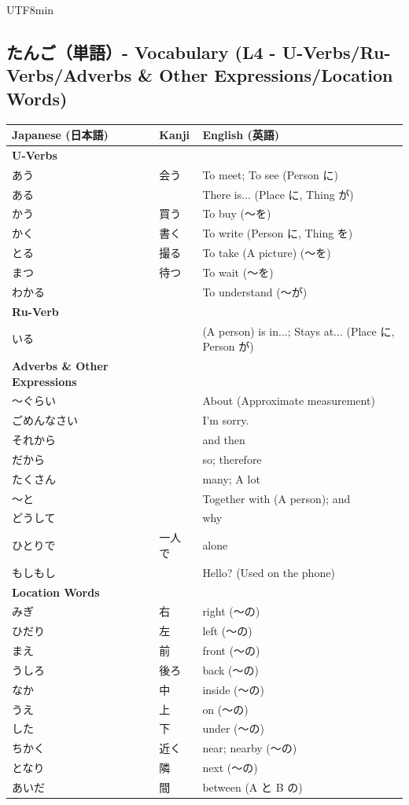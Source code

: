 \documentclass[11pt]{article}
\begin{document}
\begin{CJK}{UTF8}{min}
\subsection{たんご（単語）- Vocabulary (L4 - U-Verbs/Ru-Verbs/Adverbs \& Other Expressions/Location Words)}
\begin{tabularx}{\linewidth}{X | X | X}
    \toprule
    \textbf{Japanese (日本語)} & \textbf{Kanji} & \textbf{English (英語)} \\
    \midrule
    \textbf{U-Verbs} &  & \\
    あう & 会う & To meet; To see (Person に) \\
    ある &  & There is... (Place に, Thing が) \\
    かう & 買う & To buy (〜を) \\
    かく & 書く & To write (Person に, Thing を) \\
    とる & 撮る & To take (A picture) (〜を) \\
    まつ & 待つ & To wait (〜を) \\
    わかる &  & To understand (〜が) \\
    \hline
    \textbf{Ru-Verb} &  & \\
    いる &  & (A person) is in...; Stays at... (Place に, Person が) \\
    \hline
    \textbf{Adverbs \& Other Expressions} &  & \\
    〜ぐらい &  & About (Approximate measurement) \\
    ごめんなさい &  & I'm sorry. \\
    それから &  & and then \\
    だから &  & so; therefore \\
    たくさん &  & many; A lot \\
    〜と &  & Together with (A person); and \\
    どうして &  & why \\
    ひとりで & 一人で & alone \\
    もしもし &  & Hello? (Used on the phone) \\
    \hline
    \textbf{Location Words} &  & \\
    みぎ & 右 & right (〜の) \\
    ひだり & 左 & left (〜の) \\
    まえ & 前 & front (〜の) \\
    うしろ & 後ろ & back (〜の) \\
    なか & 中 & inside (〜の) \\
    うえ & 上 & on (〜の) \\
    した & 下 & under (〜の) \\
    ちかく & 近く & near; nearby (〜の) \\
    となり & 隣 & next (〜の) \\
    あいだ & 間 & between (A と B の) \\
    \bottomrule
\end{tabularx}


\end{CJK}
\end{document}
